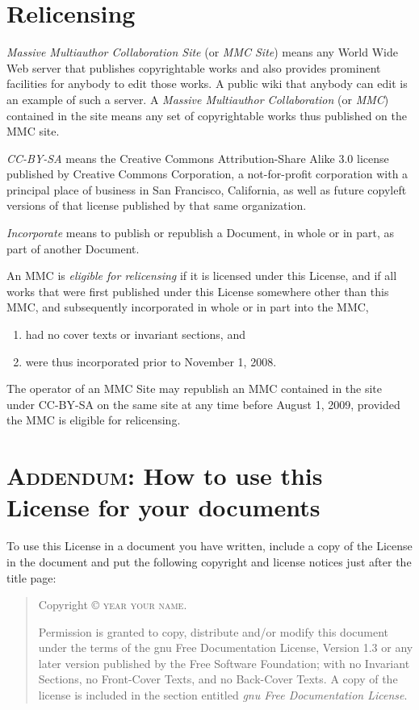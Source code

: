 \section{Relicensing}

\emph{Massive Multiauthor Collaboration Site} (or \emph{MMC Site}) means any
World Wide Web server that publishes copyrightable works and also
provides prominent facilities for anybody to edit those works.  A
public wiki that anybody can edit is an example of such a server.  A
\emph{Massive Multiauthor Collaboration} (or \emph{MMC}) contained in the
site means any set of copyrightable works thus published on the MMC
site.

\emph{CC-BY-SA} means the Creative Commons Attribution-Share Alike 3.0
license published by Creative Commons Corporation, a not-for-profit
corporation with a principal place of business in San Francisco,
California, as well as future copyleft versions of that license
published by that same organization.

\emph{Incorporate} means to publish or republish a Document, in whole or
in part, as part of another Document.

An MMC is \emph{eligible for relicensing} if it is licensed under this
License, and if all works that were first published under this License
somewhere other than this MMC, and subsequently incorporated in whole
or in part into the MMC,
\begin{enumerate}
\item had no cover texts or invariant sections, and
\item were thus incorporated prior to November 1, 2008.
\end{enumerate}

The operator of an MMC Site may republish an MMC contained in the site
under CC-BY-SA on the same site at any time before August 1, 2009,
provided the MMC is eligible for relicensing.


\section*{\textsc{Addendum}: How to use this License for your documents}

To use this License in a document you have written, include a copy of
the License in the document and put the following copyright and
license notices just after the title page:

\bigskip
\begin{quote}
  Copyright \copyright{} \textsc{year} \textsc{your name}.

  Permission is granted to copy, distribute and/or modify this
  document under the terms of the \gls{gnu} Free Documentation
  License, Version 1.3 or any later version published by the Free
  Software Foundation; with no Invariant Sections, no Front-Cover
  Texts, and no Back-Cover Texts.  A copy of the license is included
  in the section entitled \emph{\gls{gnu} Free Documentation License}.
\end{quote}
\bigskip
    
